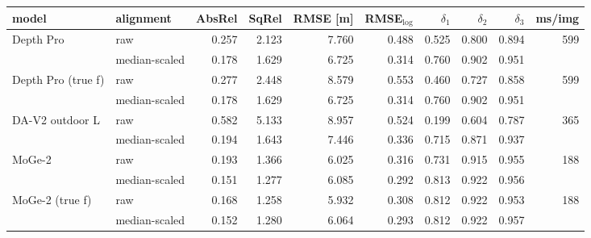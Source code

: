 \footnotesize\renewcommand{\arraystretch}{0.92}
\begin{tabular}{llrrrrrrrr}
\toprule
model & alignment & AbsRel & SqRel & RMSE [m] & RMSE$_{\log}$ & $\delta_1$ & $\delta_2$ & $\delta_3$ & ms/img \\
\midrule
Depth Pro & raw & 0.257 & 2.123 & 7.760 & 0.488 & 0.525 & 0.800 & 0.894 & 599 \\
 & median-scaled & 0.178 & 1.629 & 6.725 & 0.314 & 0.760 & 0.902 & 0.951 &  \\
Depth Pro (true f) & raw & 0.277 & 2.448 & 8.579 & 0.553 & 0.460 & 0.727 & 0.858 & 599 \\
 & median-scaled & 0.178 & 1.629 & 6.725 & 0.314 & 0.760 & 0.902 & 0.951 &  \\
DA-V2 outdoor L & raw & 0.582 & 5.133 & 8.957 & 0.524 & 0.199 & 0.604 & 0.787 & 365 \\
 & median-scaled & 0.194 & 1.643 & 7.446 & 0.336 & 0.715 & 0.871 & 0.937 &  \\
MoGe-2 & raw & 0.193 & 1.366 & 6.025 & 0.316 & 0.731 & 0.915 & 0.955 & 188 \\
 & median-scaled & 0.151 & 1.277 & 6.085 & 0.292 & 0.813 & 0.922 & 0.956 &  \\
MoGe-2 (true f) & raw & 0.168 & 1.258 & 5.932 & 0.308 & 0.812 & 0.922 & 0.953 & 188 \\
 & median-scaled & 0.152 & 1.280 & 6.064 & 0.293 & 0.812 & 0.922 & 0.957 &  \\
\bottomrule
\end{tabular}
